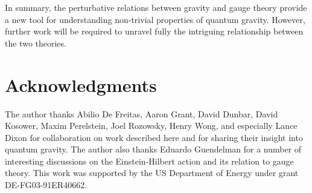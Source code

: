 \documentclass[12pt]{livrev}
\begin{document}
In summary, the perturbative relations between gravity and gauge
theory provide a new tool for understanding non-trivial properties of
quantum gravity. However, further work will be required to unravel
fully the intriguing relationship between the two theories.


\section{Acknowledgments}
\label{section:acknowledgements}

The author thanks Abilio De Freitas, Aaron Grant, David Dunbar, David
Kosower, Maxim Perelstein, Joel Rozowsky, Henry Wong, and especially
Lance Dixon for collaboration on work described here and for sharing
their insight into quantum gravity.  The author also thanks Eduardo
Guendelman for a number of interesting discussions on the Einstein-Hilbert
action and its relation to gauge theory.  This work was supported by
the US Department of Energy under grant
DE-FG03-91ER40662.

\newpage

\end{document}
